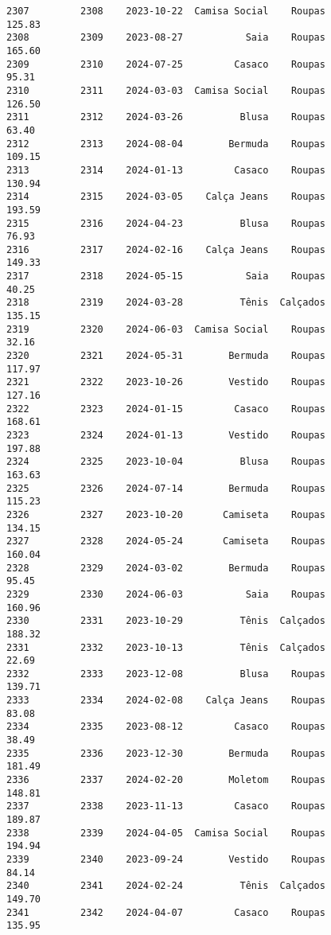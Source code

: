 \documentclass[11pt]{article}
\begin{document}
\begin{Verbatim}[commandchars=\\\{\}]
2307         2308    2023-10-22  Camisa Social    Roupas          125.83   
2308         2309    2023-08-27           Saia    Roupas          165.60   
2309         2310    2024-07-25         Casaco    Roupas           95.31   
2310         2311    2024-03-03  Camisa Social    Roupas          126.50   
2311         2312    2024-03-26          Blusa    Roupas           63.40   
2312         2313    2024-08-04        Bermuda    Roupas          109.15   
2313         2314    2024-01-13         Casaco    Roupas          130.94   
2314         2315    2024-03-05    Calça Jeans    Roupas          193.59   
2315         2316    2024-04-23          Blusa    Roupas           76.93   
2316         2317    2024-02-16    Calça Jeans    Roupas          149.33   
2317         2318    2024-05-15           Saia    Roupas           40.25   
2318         2319    2024-03-28          Tênis  Calçados          135.15   
2319         2320    2024-06-03  Camisa Social    Roupas           32.16   
2320         2321    2024-05-31        Bermuda    Roupas          117.97   
2321         2322    2023-10-26        Vestido    Roupas          127.16   
2322         2323    2024-01-15         Casaco    Roupas          168.61   
2323         2324    2024-01-13        Vestido    Roupas          197.88   
2324         2325    2023-10-04          Blusa    Roupas          163.63   
2325         2326    2024-07-14        Bermuda    Roupas          115.23   
2326         2327    2023-10-20       Camiseta    Roupas          134.15   
2327         2328    2024-05-24       Camiseta    Roupas          160.04   
2328         2329    2024-03-02        Bermuda    Roupas           95.45   
2329         2330    2024-06-03           Saia    Roupas          160.96   
2330         2331    2023-10-29          Tênis  Calçados          188.32   
2331         2332    2023-10-13          Tênis  Calçados           22.69   
2332         2333    2023-12-08          Blusa    Roupas          139.71   
2333         2334    2024-02-08    Calça Jeans    Roupas           83.08   
2334         2335    2023-08-12         Casaco    Roupas           38.49   
2335         2336    2023-12-30        Bermuda    Roupas          181.49   
2336         2337    2024-02-20        Moletom    Roupas          148.81   
2337         2338    2023-11-13         Casaco    Roupas          189.87   
2338         2339    2024-04-05  Camisa Social    Roupas          194.94   
2339         2340    2023-09-24        Vestido    Roupas           84.14   
2340         2341    2024-02-24          Tênis  Calçados          149.70   
2341         2342    2024-04-07         Casaco    Roupas          135.95   

\end{Verbatim}
\end{document}
